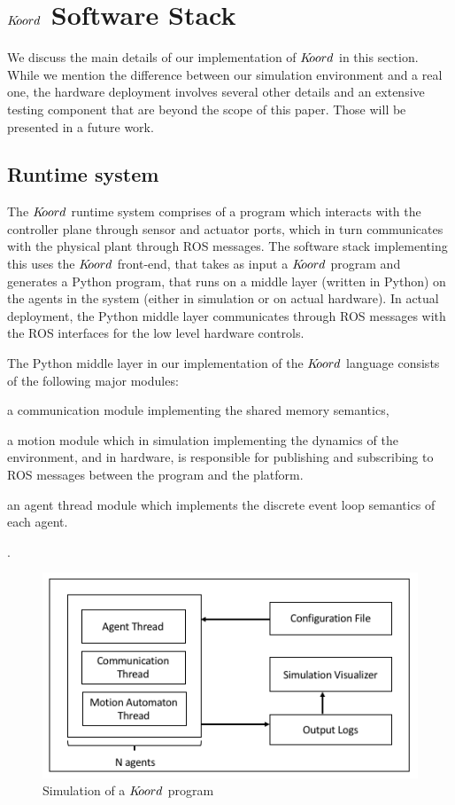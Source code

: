 \section{$K\kern-2pt oord$ Software Stack}
\label{sec:software}
We discuss the main details of our implementation of $K\kern-2pt oord$ in this section. While we mention the difference between our simulation environment and a real one, the hardware deployment involves several other details and an extensive testing component that are beyond the scope of this paper. Those will be presented in a future work. 
\subsection{Runtime system}
 The $K\kern-2pt oord$ runtime system comprises of a program which interacts with the controller plane through sensor and actuator ports, which in turn communicates with the physical plant through ROS messages. The software stack implementing this uses the $K\kern-2pt oord$ front-end, that takes as input a $K\kern-2pt oord$ program and generates a Python program, that runs on a middle layer (written in Python) on the agents in the system (either in simulation or on actual hardware). In actual deployment, the Python middle layer communicates through ROS messages with the ROS interfaces for the low level hardware controls. 


The Python middle layer in our implementation of the $K\kern-2pt oord$ language consists of the following major modules:\begin{inparaenum}
\item a communication module implementing the shared memory semantics,
\item a motion module which in simulation implementing the dynamics of the environment, and in hardware, is responsible for publishing and subscribing to ROS messages between the program and the platform.  
\item an agent thread module which implements the discrete event loop semantics of each agent. 
\end{inparaenum}. 

\begin{figure}
\includegraphics[scale=0.26]{figs/simulationengine.png}\hfill
\caption{\small Simulation of a $K\kern-2pt oord$ program }
\label{fig:completionstats}
\end{figure}

